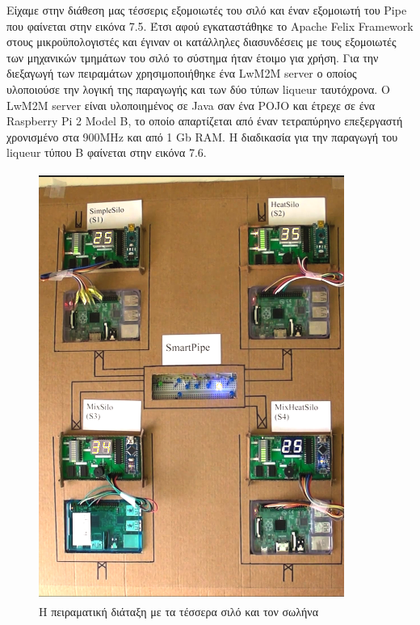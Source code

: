 	Είχαμε στην διάθεση μας τέσσερις εξομοιωτές του σιλό και έναν εξομοιωτή του Pipe που φαίνεται στην εικόνα 7.5. Έτσι αφού εγκαταστάθηκε το Apache Felix Framework στους μικροϋπολογιστές και έγιναν οι κατάλληλες διασυνδέσεις με τους εξομοιωτές των μηχανικών τμημάτων του σιλό το σύστημα ήταν έτοιμο για χρήση. Για την διεξαγωγή των πειραμάτων χρησιμοποιήθηκε ένα LwM2M server ο οποίος υλοποιούσε την λογική της παραγωγής και των δύο τύπων liqueur ταυτόχρονα. Ο LwM2M server είναι υλοποιημένος σε Java σαν ένα POJO και έτρεχε σε ένα Raspberry Pi 2 Model B, το οποίο απαρτίζεται από έναν τετραπύρηνο επεξεργαστή χρονισμένο στα 900MHz και από 1 Gb RAM. Η διαδικασία για την παραγωγή του liqueur τύπου Β φαίνεται στην εικόνα 7.6.
	
\begin{figure}[htbp]
	\centering
		\includegraphics[height=14cm,width=10cm]{Figures/25.png}
	\caption{H πειραματική διάταξη με τα τέσσερα σιλό και τον σωλήνα}	
\end{figure}

